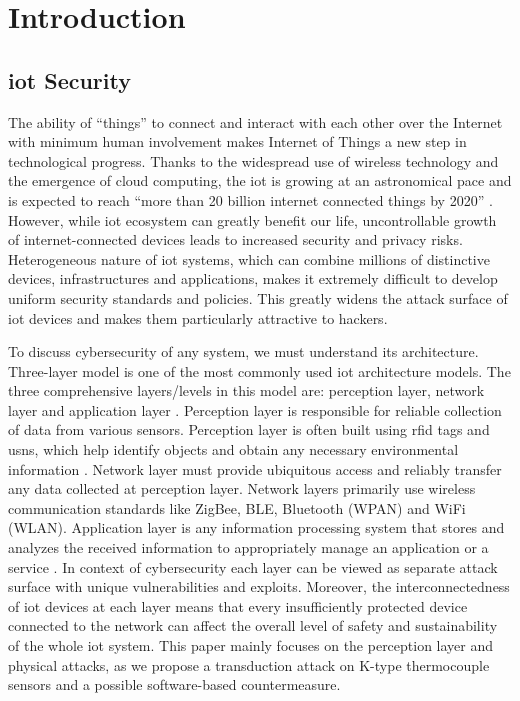 \section{Introduction}

\subsection{\ac{iot} Security}

The ability of ``things'' to connect and interact with each other over the Internet with minimum human involvement makes Internet of Things a new step in technological progress. Thanks to the widespread use of wireless technology and the emergence of cloud computing, the \ac{iot} is growing at an astronomical pace and is expected to reach ``more than 20 billion internet connected things by 2020'' \cite{Gartner17}. However, while \ac{iot} ecosystem can greatly benefit our life, uncontrollable growth of internet-connected devices leads to increased security and privacy risks. Heterogeneous nature of \ac{iot} systems, which can combine millions of distinctive devices, infrastructures and applications, makes it extremely difficult to develop uniform security standards and policies. This greatly widens the attack surface of \ac{iot} devices and makes them particularly attractive to hackers. 

To discuss cybersecurity of any system, we must understand its architecture. Three-layer model is one of the most commonly used \ac{iot} architecture models. The three comprehensive layers/levels in this model are: perception layer, network layer and application layer \cite{Mendez17,Deogirikar17,Krishna17}. Perception layer is responsible for reliable collection of data from various sensors. Perception layer is often built using \ac{rfid} tags and \acp{usn}, which help identify objects and obtain any necessary environmental information \cite{Devera14,Deng12}. Network layer must provide ubiquitous access and reliably transfer any data collected at perception layer. Network layers primarily use wireless communication standards like ZigBee, BLE, Bluetooth (WPAN) and WiFi (WLAN). Application layer is any information processing system that stores and analyzes the received information to appropriately manage an application or a service \cite{Yang17}. In context of cybersecurity each layer can be viewed as separate attack surface with unique vulnerabilities and exploits. Moreover, the interconnectedness of \ac{iot} devices at each layer means that every insufficiently protected device connected to the network can affect the overall level of safety and sustainability of the whole \ac{iot} system. This paper mainly focuses on the perception layer and physical attacks, as we propose a transduction attack on K-type thermocouple sensors and a possible software-based countermeasure. 

